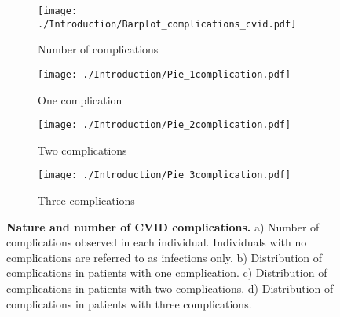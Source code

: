 \begin{figure}[H]
\centering
\begin{subfigure}[b]{0.49\textwidth}
	\centering
	\texttt{[image: ./Introduction/Barplot\_complications\_cvid.pdf]}%
	\caption{Number of complications}%
\end{subfigure}
\begin{subfigure}[b]{0.49\textwidth}
	\centering
	\texttt{[image: ./Introduction/Pie\_1complication.pdf]}%
	\caption{One complication}%
\end{subfigure}
\begin{subfigure}[b]{0.49\textwidth}
	\centering
	\texttt{[image: ./Introduction/Pie\_2complication.pdf]}%
	\caption{Two complications}%
\end{subfigure}
\begin{subfigure}[b]{0.49\textwidth}
	\centering
	\texttt{[image: ./Introduction/Pie\_3complication.pdf]}%
	\caption{Three complications}%
\end{subfigure}
\caption[Nature and number of CVID complications]{\textbf{Nature and number of CVID complications.} a) Number of complications observed in each individual. Individuals with no complications are referred to as infections only. b) Distribution of complications in patients with one complication. c)  Distribution of complications in patients with two complications. d)  Distribution of complications in patients with three complications. \parencite{Chapel2008}}
\label{fig:complications.intro.cvid}
\end{figure}


